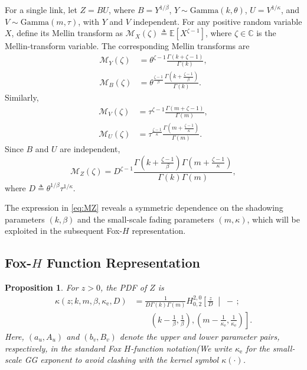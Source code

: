 \documentclass[lettersize,journal]{IEEEtran}
\newtheorem{proposition}{Proposition}
\begin{document}
For a single link, let \(Z=BU\), where \(B=Y^{1/\beta}\), \(Y\sim\mathrm{Gamma}(k,\theta)\), \(U=V^{1/\kappa}\), and \(V\sim\mathrm{Gamma}(m,\tau)\), with \(Y\) and \(V\) independent. For any positive random variable \(X\), define its Mellin transform as \(\mathcal M_X(\zeta)\triangleq\mathbb E[X^{\zeta-1}]\), where \(\zeta\in\mathbb C\) is the Mellin-transform variable. The corresponding Mellin transforms are
\begin{equation}
\begin{aligned}
\mathcal M_Y(\zeta)
&=\theta^{\zeta-1}\frac{\Gamma(k+\zeta-1)}{\Gamma(k)},\\
\mathcal M_B(\zeta)
&=\theta^{\frac{\zeta-1}{\beta}}
\frac{\Gamma\!\left(k+\frac{\zeta-1}{\beta}\right)}{\Gamma(k)}.
\end{aligned}
\label{eq:mellin_Y_B}
\end{equation}
Similarly,
\begin{equation}
\begin{aligned}
\mathcal M_V(\zeta)
&=\tau^{\zeta-1}\frac{\Gamma(m+\zeta-1)}{\Gamma(m)},\\
\mathcal M_U(\zeta)
&=\tau^{\frac{\zeta-1}{\kappa}}
\frac{\Gamma\!\left(m+\frac{\zeta-1}{\kappa}\right)}{\Gamma(m)}.
\end{aligned}
\label{eq:mellin_V_U}
\end{equation}
Since \(B\) and \(U\) are independent,
\begin{equation}
\mathcal M_Z(\zeta)
=D^{\zeta-1}
\frac{\Gamma\!\left(k+\frac{\zeta-1}{\beta}\right)
\Gamma\!\left(m+\frac{\zeta-1}{\kappa}\right)}
{\Gamma(k)\Gamma(m)},
\label{eq:MZ}
\end{equation}
where \(D\triangleq\theta^{1/\beta}\tau^{1/\kappa}\).

The expression in \eqref{eq:MZ} reveals a symmetric dependence on the shadowing parameters \((k,\beta)\) and the small-scale fading parameters \((m,\kappa)\), which will be exploited in the subsequent Fox-\(H\) representation.

\subsection{Fox-\(H\) Function Representation}
\begin{proposition}\label{prop:1prime}
For \(z>0\), the PDF of \(Z\) is
\begin{equation}
\begin{aligned}
\kappa(z;k,m,\beta,\kappa_{\mathrm e},D)
&=\frac{1}{D\Gamma(k)\Gamma(m)}
H^{2,0}_{0,2}\!\left[
\frac{z}{D}\;\middle|\;-\,;
\right.\\[-1mm]
&\qquad\left.
\left(k-\frac{1}{\beta},\frac{1}{\beta}\right),
\left(m-\frac{1}{\kappa_{\mathrm e}},
\frac{1}{\kappa_{\mathrm e}}\right)
\right].
\end{aligned}
\label{eq:PDFgggg}
\end{equation}
Here, \((a_u,A_u)\) and \((b_v,B_v)\) denote the upper and lower
parameter pairs, respectively, in the standard Fox \(H\)-function
notation(We write \(\kappa_{\mathrm e}\) for the small-scale GG exponent to avoid clashing with the kernel symbol \(\kappa(\cdot)\).
\end{proposition}
\end{document}
